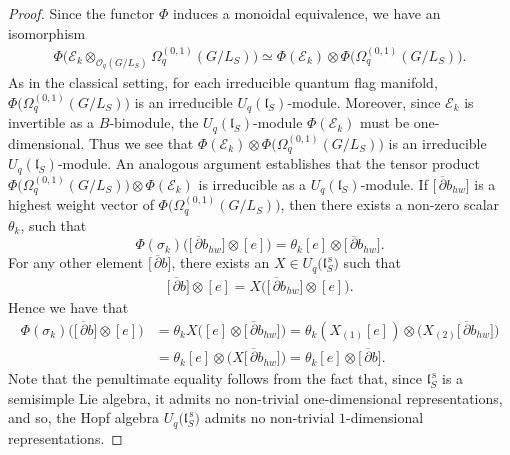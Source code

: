 \documentclass[10pt,a4paper]{amsart}
\numberwithin{equation}{section}
\newcommand\adel{\overline{\partial}}
\begin{document}
\begin{proof}
Since the functor $\Phi$ induces a monoidal equivalence, we have an isomorphism
\begin{gather*}%
\Phi\big(\mathcal{E}_k \otimes_{\mathcal{O}_q(G/L_S)} \Omega^{(0,1)}_q(G/L_S)\big) \simeq \Phi(\mathcal{E}_k) \otimes \Phi\big(\Omega^{(0,1)}_q(G/L_S)\big).
\end{gather*}
As in the classical setting, for each irreducible quantum flag manifold, $\Phi\big(\Omega^{(0,1)}_q(G/L_S)\big)$ is an irreducible $U_q(\mathfrak{l}_S)$-module. Moreover, since $\mathcal{E}_k$ is invertible as a $B$-bimodule, the $U_q(\mathfrak{l}_S)$-module $\Phi(\mathcal{E}_k)$ must be one-dimensional. Thus we see that $\Phi(\mathcal{E}_k) \otimes \Phi\big(\Omega^{(0,1)}_q(G/L_S)\big)$ is an irreducible $U_q(\mathfrak{l}_S)$-module. An analogous argument establishes that the tensor product $\Phi\big(\Omega^{(0,1)}_q(G/L_S)\big) \otimes \Phi(\mathcal{E}_k)$ is irreducible as a $U_q(\mathfrak{l}_S)$-module.
If $\big[\,\adel b_{hw}\big]$ is a highest weight vector of $\Phi\big(\Omega^{(0,1)}_q(G/L_S)\big)$, then there exists a non-zero scalar~$\theta_k$, such that
\[
\Phi(\sigma_k)\big(\big[\,\adel b_{hw}\big] \otimes [e]\big) = \theta_k [e] \otimes \big[\,\adel b_{hw}\big].
\]
For any other element $\big[\,\adel b\big]$, there exists an $X\in U_q\big(\mathfrak{l}_S^{\,\mathrm{s}}\big)$ such that
\begin{gather*}
 \big[\,\adel b\big] \otimes [e]=X\big(\big[\,\adel b_{hw}\big] \otimes [e]\big).
\end{gather*}
Hence we have that
\begin{align*}
 \Phi(\sigma_k)\big(\big[\,\adel b\big] \otimes [e]\big) &= \theta_k X\big([e] \otimes \big[\,\adel b_{hw}\big]\big)
= \theta_k (X_{(1)}[e]) \otimes \big(X_{(2)}\big[\,\adel b_{hw}\big]\big)\\
&= \theta_k [e] \otimes \big(X\big[\,\adel b_{hw}\big]\big)
= \theta_k [e] \otimes \big[\,\adel b\big].
\end{align*}
Note that the penultimate equality follows from the fact that, since $\mathfrak{l}_S^{\,\mathrm{s}}$ is a semisimple Lie algebra, it admits no non-trivial one-dimensional representations, and so, the Hopf algebra $U_q\big(\mathfrak{l}_S^{\,\mathrm{s}}\big)$ admits no non-trivial $1$-dimensional representations.


\end{proof}
\end{document}
